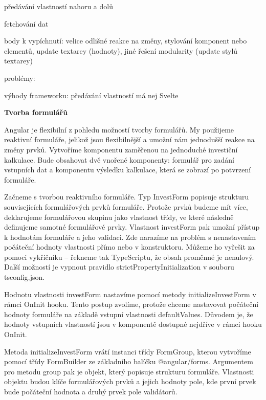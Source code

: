 \begin{citemize}
	\item předávání vlastností nahoru a dolů
	\item fetchování dat
	\item body k vypíchnutí: velice odlišné reakce na změny, stylování komponent nebo elementů, update textarey (hodnoty), jiné řešení modularity (update stylů textarey)
	\item problémy:
	\item výhody frameworku: předávání vlastností má nej Svelte
\end{citemize}

\begin{flushleft}
  \textbf{Tvorba formulářů}
\end{flushleft}

Angular je flexibilní z pohledu možností tvorby formulářů. My použijeme reaktivní formuláře, jelikož jsou flexibilnější a umožní nám jednodušší reakce na změny prvků.
Vytvoříme komponentu zaměřenou na jednoduché investiční kalkulace. 
Bude obsahovat dvě vnořené komponenty: formulář pro zadání vstupních dat a komponentu výsledku kalkulace, která se zobrazí po potvrzení formuláře.

Začneme s tvorbou reaktivního formuláře. Typ InvestForm popisuje strukturu souvisejících formulářových prvků formuláře. 
Protože prvků budeme mít více, deklarujeme formulářovou skupinu jako vlastnost třídy, ve které následně definujeme samotné formulářové prvky. 
Vlastnost investForm pak umožní přístup k hodnotám formuláře a jeho validaci. Zde narazíme na problém s nenastavením počáteční hodnoty vlastnosti přímo nebo v konstruktoru. 
Můžeme ho vyřešit za pomoci vykřičníku -- řekneme tak TypeScriptu, že obsah proměnné je nenulový. Další možností je vypnout pravidlo strictPropertyInitialization v souboru tsconfig.json.

Hodnotu vlastnosti investForm nastavíme pomocí metody initializeInvestForm v rámci OnInit hooku. 
Tento postup zvolíme, protože chceme nastavovat počáteční hodnoty formuláře na základě vstupní vlastnosti defaultValues.
Důvodem je, že hodnoty vstupních vlastností jsou v komponentě dostupné nejdříve v rámci hooku OnInit.

Metoda initializeInvestForm vrátí instanci třídy FormGroup, kterou vytvoříme pomocí třídy FormBuilder ze základního balíčku @angular/forms. 
Argumentem pro metodu group pak je objekt, který popisuje strukturu formuláře. 
Vlastnosti objektu budou klíče formulářových prvků a jejich hodnoty pole, kde první prvek bude počáteční hodnota a druhý prvek pole validátorů.

